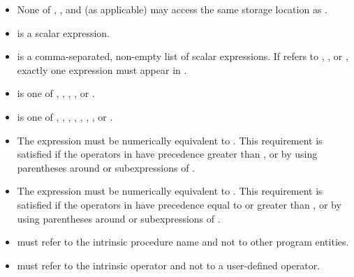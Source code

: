 \begin{fortranspecific}
\begin{itemize}
\vspace{-2 pt} %
\item None of , , and  (as applicable) may access the same storage location as
.

\vspace{-2 pt} %
\item {} is a scalar expression.

\vspace{-2 pt} %
\item {} is a comma-separated, non-empty list of scalar expressions. If
 refers to , , or , exactly one expression
must appear in .

\vspace{-2 pt} %
\item {} is one of , , , , or .

\vspace{-2 pt} %
\item {} is one of \code{+}, \code{*}, \code{-}, \code{/}, , , , or .

\vspace{-2 pt} %
\item The expression  must be numerically equivalent to .
This requirement is satisfied if the operators in  have precedence greater than
, or by using parentheses around  or subexpressions of .

\vspace{-2 pt} %
\item The expression  must be numerically equivalent to . This requirement is satisfied if the operators in  have precedence equal to or
greater than , or by using parentheses around  or subexpressions of .

\vspace{-2 pt} %
\item {} must refer to the intrinsic procedure name and not to other
program entities.

\vspace{-2 pt} %
\item {} must refer to the intrinsic operator and not to a user-defined operator.


\end{itemize}
\end{fortranspecific}
